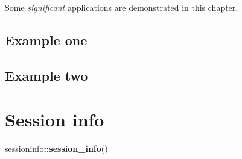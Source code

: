 \documentclass[ngerman,a4paper,]{scrartcl}
\newenvironment{Shaded}{\begin{snugshade}}{\end{snugshade}}
\newcommand{\KeywordTok}[1]{\textcolor[rgb]{0.13,0.29,0.53}{\textbf{#1}}}
\newcommand{\NormalTok}[1]{#1}
\newcommand{\OperatorTok}[1]{\textcolor[rgb]{0.81,0.36,0.00}{\textbf{#1}}}
\begin{document}
Some \emph{significant} applications are demonstrated in this chapter.

\hypertarget{example-one}{%
\subsection{Example one}\label{example-one}}

\hypertarget{example-two}{%
\subsection{Example two}\label{example-two}}

\hypertarget{session-info}{%
\section{Session info}\label{session-info}}

\begin{Shaded}
\begin{Highlighting}[]
\NormalTok{sessioninfo}\OperatorTok{::}\KeywordTok{session_info}\NormalTok{()}
\end{Highlighting}
\end{Shaded}
\end{document}
